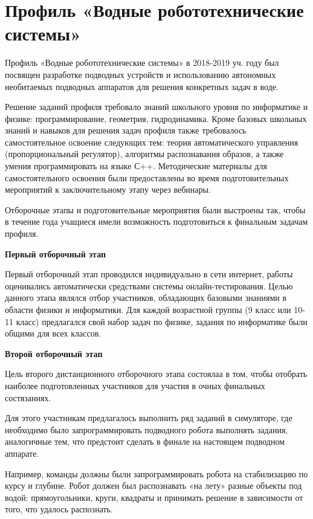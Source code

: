

\chapter{Профиль «Водные робототехнические системы»}

Профиль «Водные робототехнические системы» в 2018-2019 уч. году был посвящен разработке подводных устройств и использованию автономных необитаемых подводных аппаратов для решения конкретных задач в воде. 

Решение заданий профиля требовало знаний школьного уровня по информатике и физике: программирование, геометрия, гидродинамика. Кроме базовых школьных знаний и навыков для решения задач профиля также требовалось самостоятельное освоение следующих тем: теория автоматического управления (пропорциональный регулятор), алгоритмы распознавания образов, а также умения программировать на языке С++. Методические материалы для самостоятельного освоения были предоставлены во время подготовительных мероприятий к заключительному этапу через вебинары.

Отборочные этапы и подготовительные мероприятия были выстроены так, чтобы в течение года учащиеся имели возможность подготовиться к финальным задачам профиля.

\textbf{Первый отборочный этап}

Первый отборочный этап проводился индивидуально в сети интернет, работы оценивались автоматически средствами системы онлайн-тестирования. Целью данного этапа являлся отбор участников, обладающих базовыми знаниями в области физики и информатики.  Для каждой возрастной группы (9 класс или 10-11 класс) предлагался свой набор задач по физике, задания по информатике были общими для всех классов. 

\textbf{Второй отборочный этап}

Цель второго дистанционного отборочного этапа состоялаа в том, чтобы отобрать наиболее подготовленных участников для участия в очных финальных состязаниях. 

Для этого участникам предлагалось выполнить ряд заданий в симуляторе, где необходимо было запрограммировать подводного робота выполнять задания, аналогичные тем, что предстоит сделать в финале на настоящем подводном аппарате. 

Например, команды должны были запрограммировать робота на стабилизацию по курсу и глубине. Робот должен был распознавать «на лету» разные объекты под водой: прямоугольники, круги, квадраты и принимать решение в зависимости от того, что удалось распознать.

